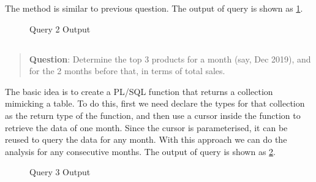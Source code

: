 \documentclass[
  a4paper,
]{article}
\begin{document}
The method is similar to previous question. The output of query is shown
as \cref{fig:q2-output}.

\begin{figure}
    \centering
    \caption{Query 2 Output\label{fig:q2-output}}
\end{figure}

\hypertarget{section-2}{%
\subsection{}\label{section-2}}

\begin{quote}
\textbf{Question}: Determine the top 3 products for a month (say, Dec
2019), and for the 2 months before that, in terms of total sales.
\end{quote}

The basic idea is to create a PL/SQL function that returns a collection
mimicking a table. To do this, first we need declare the types for that
collection as the return type of the function, and then use a cursor
inside the function to retrieve the data of one month. Since the cursor
is parameterised, it can be reused to query the data for any month. With
this approach we can do the analysis for any consecutive months. The
output of query is shown as \cref{fig:q3-output}.

\begin{figure}
    \centering
    \caption{Query 3 Output\label{fig:q3-output}}
\end{figure}
\end{document}
